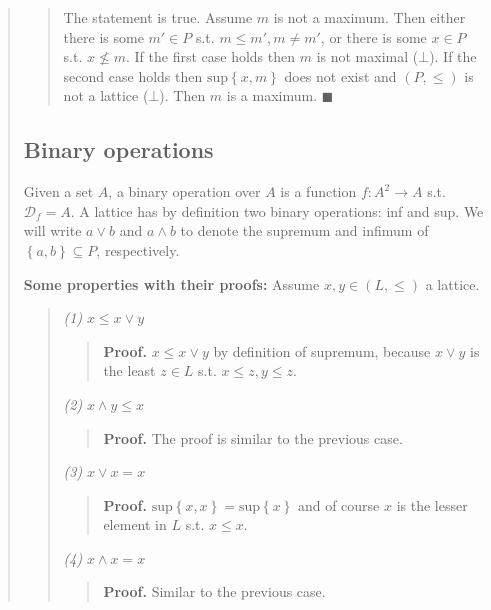 \documentclass[a4paper, 12pt]{article}
\begin{document}
\begin{quote}
\begin{quote}
The statement is true. Assume $m$ is not a maximum. Then either there is some
$m' \in P$ s.t. $m \leq m', m \neq m'$, or there is some $x \in P$
s.t. $x \not\leq m$. If the first case holds then $m$ is not maximal ($\bot$).
If the second case holds then $\text{sup}\left\{ x, m \right\} $ does not exist
and $(P, \leq) $ is not a lattice ($\bot$). Then $m$ is a maximum. $\blacksquare$


\end{quote}
\normalsize



\subsection{Binary operations}

Given a set $A$, a binary operation over $A$ is a function $f : A^2 \to A$ s.t.
$\mathcal{D}_f = A$. A lattice has by definition two binary operations: inf and
sup. We will write $a \lor b$ and $a \land b$ to denote the supremum
and infimum of $\left\{ a, b \right\} \subseteq P$, respectively.

\textbf{Some properties with their proofs:} Assume $x, y \in (L, \leq)$ a
lattice.

\begin{quote}
    \textit{(1)} $x \leq x \lor  y$ 

    \begin{quote}
        \textbf{Proof.} $x \leq x \lor  y$ by definition of supremum, because $x
        \lor  y$ is the least $z \in L$ s.t. $x \leq z, y \leq z$.
    \end{quote}

    \textit{(2)} $x \land  y \leq x$
    \begin{quote}
        \textbf{Proof.} The proof is similar to the previous case.
    \end{quote}

    \textit{(3)} $x \lor  x = x$

    \begin{quote}
        \textbf{Proof.} $\text{sup}\left\{ x, x \right\} = \text{sup}\left\{ x
        \right\} $ and of course $x$ is the lesser element in $L$ s.t. $x \leq
        x$.
    \end{quote}

    \textit{(4)} $x \land  x = x$
    \begin{quote}
        \textbf{Proof.} Similar to the previous case.
    \end{quote}



\end{quote}
\end{quote}
\end{document}
